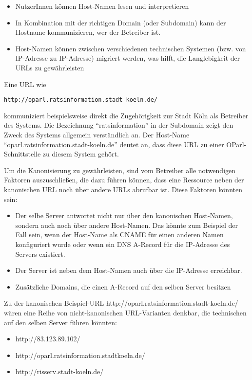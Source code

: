 \documentclass[,a4paper]{article}
\begin{document}
\begin{itemize}
\item
  NutzerInnen können Host-Namen lesen und interpretieren
\item
  In Kombination mit der richtigen Domain (oder Subdomain) kann der
  Hostname kommunizieren, wer der Betreiber ist.
\item
  Host-Namen können zwischen verschiedenen technischen Systemen (bzw.
  von IP-Adresse zu IP-Adresse) migriert werden, was hilft, die
  Langlebigkeit der URLs zu gewährleisten
\end{itemize}

Eine URL wie

\begin{verbatim}
http://oparl.ratsinformation.stadt-koeln.de/
\end{verbatim}

kommuniziert beispielsweise direkt die Zugehörigkeit zur Stadt Köln als
Betreiber des Systems. Die Bezeichnung ``ratsinformation'' in der
Subdomain zeigt den Zweck des Systems allgemein verständlich an. Der
Host-Name ``oparl.ratsinformation.stadt-koeln.de'' deutet an, dass diese
URL zu einer OParl-Schnittstelle zu diesem System gehört.

Um die Kanonisierung zu gewährleisten, sind vom Betreiber alle
notwendigen Faktoren auszuschließen, die dazu führen können, dass eine
Ressource neben der kanonischen URL noch über andere URLs abrufbar ist.
Diese Faktoren könnten sein:

\begin{itemize}
\item
  Der selbe Server antwortet nicht nur über den kanonischen Host-Namen,
  sondern auch noch über andere Host-Namen. Das könnte zum Beispiel der
  Fall sein, wenn der Host-Name als CNAME für einen anderen Namen
  konfiguriert wurde oder wenn ein DNS A-Record für die IP-Adresse des
  Servers existiert.
\item
  Der Server ist neben dem Host-Namen auch über die IP-Adresse
  erreichbar.
\item
  Zusätzliche Domains, die einen A-Record auf den selben Server besitzen
\end{itemize}

Zu der kanonischen Beispiel-URL
http://oparl.ratsinformation.stadt-koeln.de/ wären eine Reihe von
nicht-kanonischen URL-Varianten denkbar, die technischen auf den selben
Server führen könnten:

\begin{itemize}
\item
  http://83.123.89.102/
\item
  http://oparl.ratsinformation.stadtkoeln.de/
\item
  http://risserv.stadt-koeln.de/
\end{itemize}
\end{document}
